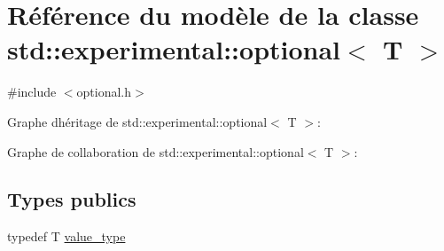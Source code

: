 \hypertarget{classstd_1_1experimental_1_1optional}{}\section{Référence du modèle de la classe std\+:\+:experimental\+:\+:optional$<$ T $>$}
\label{classstd_1_1experimental_1_1optional}


{\ttfamily \#include $<$optional.\+h$>$}



Graphe d\textquotesingle{}héritage de std\+:\+:experimental\+:\+:optional$<$ T $>$\+:


Graphe de collaboration de std\+:\+:experimental\+:\+:optional$<$ T $>$\+:
\subsection*{Types publics}
\begin{DoxyCompactItemize}
\item 
typedef T \hyperlink{classstd_1_1experimental_1_1optional_a3b480b4a74492ffdbcc9d8529ed512fc}{value\+\_\+type}
\end{DoxyCompactItemize}
